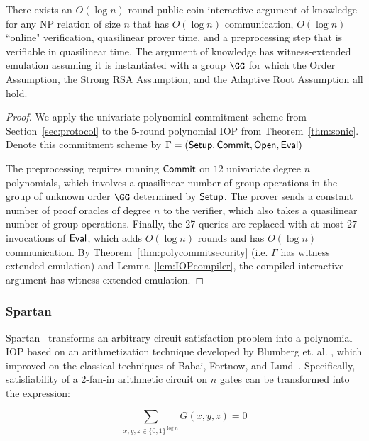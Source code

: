 \begin{theorem}
There exists an $O(\log n)$-round public-coin interactive argument of knowledge for any NP relation of size $n$ that has $O(\log n)$ communication, $O(\log n)$ ``online" verification, quasilinear prover time, and a preprocessing step that is verifiable in quasilinear time. The argument of knowledge has witness-extended emulation assuming it is instantiated with a group $\GG$ for which the Order Assumption, the Strong RSA Assumption, and the Adaptive Root Assumption all hold. 
\end{theorem}
\begin{proof}
We apply the univariate polynomial commitment scheme from Section~\ref{sec:protocol} to the 5-round polynomial IOP from Theorem~\ref{thm:sonic}. Denote this commitment scheme by $\Gamma = (\textsf{{Setup}}, \textsf{{Commit}}, \textsf{{Open}}, \textsf{{Eval}})$ 

The preprocessing requires running $\textsf{{Commit}}$ on $12$ univariate degree $n$ polynomials, which involves a quasilinear number of group operations in the group of unknown order $\GG$ determined by $\textsf{{Setup}}$. The prover sends a constant number of proof oracles of degree $n$ to the verifier, which also takes a quasilinear number of group operations. Finally, the 27 queries are replaced with at most $27$ invocations of $\textsf{{Eval}}$, which adds $O(\log n )$ rounds and has $O(\log n)$ communication. By Theorem~\ref{thm:polycommitsecurity} (i.e. $\Gamma$ has witness extended emulation) and Lemma~\ref{lem:IOPcompiler}, the compiled interactive argument has witness-extended emulation.

\end{proof}

\subsubsection{Spartan}
\textsf{Spartan}~\cite{Spartan} transforms an arbitrary circuit satisfaction problem into a polynomial IOP based on an arithmetization technique developed by Blumberg et. al. \cite{EPRINT:BTVW14}, which improved on the classical techniques of Babai, Fortnow, and Lund~\cite{BFL}. Specifically, satisfiability of a 2-fan-in arithmetic circuit on $n$ gates can be transformed into the expression: 

\begin{equation}\label{eqn:hypercubesum}
\sum_{x, y, z \in \{0,1\}^{\log n}} G(x, y, z) = 0
\end{equation} 

